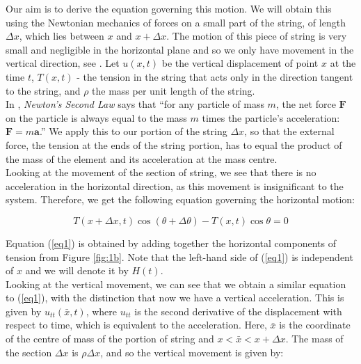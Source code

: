 \documentclass[a4paper, 12pt]{article}
\numberwithin{equation}{section}
\begin{document}
Our aim is to derive the equation governing this motion. We will obtain this using the Newtonian
mechanics of forces on a small part of the string, of length $\Delta x$, which lies between $x$ and 
$x+\Delta x$. The motion of this piece of string is very small and negligible in the horizontal plane
and so we only have movement
in the vertical direction, see \cite{Kr}. Let $u(x,t)$ be the vertical displacement of point $x$ at the time $t$, 
$T(x,t)$ - the tension in the string that acts only in the direction tangent to the string, and $\rho$ the 
mass per unit length of the string. 
\\

In \cite{Tay}, \emph{Newton's Second Law} says that ``for any particle of mass $m$, the net force 
$\boldsymbol{F}$ on the particle is always equal to the mass $m$ times the particle's 
acceleration: $\boldsymbol{F} = m \boldsymbol{a}$.''  We apply this to our 
portion of the string $\Delta x$, so that the external
force, the tension at the ends of the string portion, has to equal the product of the mass of the element and 
its acceleration at the mass centre. 
\\

Looking at the movement of the section of string, we see that there is no acceleration in the horizontal direction,  
as this movement is insignificant to the system. Therefore, we get the 
following equation governing the horizontal motion:

\begin {equation} \label{eq1}
    T(x+\Delta x,t)\cos{(\theta + \Delta \theta)}-T(x,t)\cos{\theta}=0
\end {equation}

Equation (\ref{eq1}) is obtained by adding together the horizontal components of tension from Figure \ref{fig:1b}. Note that the left-hand
side of (\ref{eq1}) is independent of $x$ and we will denote it by $H(t)$.
\\

Looking at the vertical movement, we can see that we obtain a similar equation to (\ref{eq1}), with the distinction
that now we have a vertical acceleration. This is given by $u_{tt} (\bar{x},t)$, where $u_{tt}$ is the second derivative
of the displacement with respect to time, which is equivalent to the acceleration. Here,
 $\bar{x}$ is the coordinate of the centre of mass of the portion of string and $x<\bar{x}<x+\Delta x$. The mass of the 
 section $\Delta x$ is $\rho\Delta x$, and so the vertical movement is given by:
\end{document}
